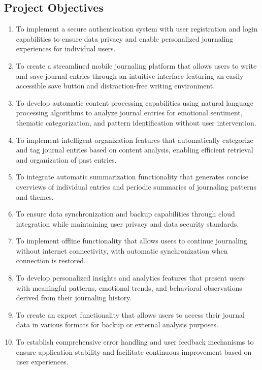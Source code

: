 \subsection{Project Objectives}\label{subsec:project-objectives}

\begin{enumerate}
	\item To implement a secure authentication system with user registration and login capabilities to ensure data privacy and enable personalized journaling experiences for individual users.
	
	\item To create a streamlined mobile journaling platform that allows users to write and save journal entries through an intuitive interface featuring an easily accessible save button and distraction-free writing environment.
	
	\item To develop automatic content processing capabilities using natural language processing algorithms to analyze journal entries for emotional sentiment, thematic categorization, and pattern identification without user intervention.
	
	\item To implement intelligent organization features that automatically categorize and tag journal entries based on content analysis, enabling efficient retrieval and organization of past entries.
	
	\item To integrate automatic summarization functionality that generates concise overviews of individual entries and periodic summaries of journaling patterns and themes.
	
	\item To ensure data synchronization and backup capabilities through cloud integration while maintaining user privacy and data security standards.
	
	\item To implement offline functionality that allows users to continue journaling without internet connectivity, with automatic synchronization when connection is restored.
	
	\item To develop personalized insights and analytics features that present users with meaningful patterns, emotional trends, and behavioral observations derived from their journaling history.
	
	\item To create an export functionality that allows users to access their journal data in various formats for backup or external analysis purposes.
	
	\item To establish comprehensive error handling and user feedback mechanisms to ensure application stability and facilitate continuous improvement based on user experiences.
\end{enumerate}

